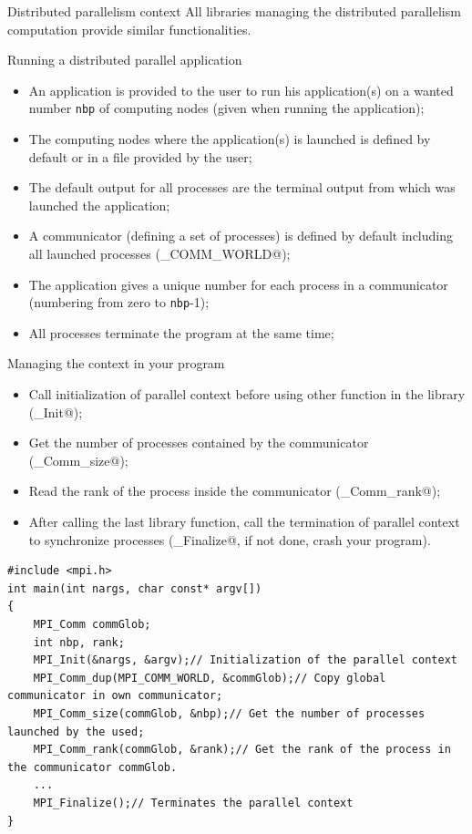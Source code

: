 \documentclass[compress,10pt,aspectratio=169]{beamer}
\begin{document}
\begin{frame}[fragile]{Distributed parallelism context}
    \small
    All libraries managing the distributed parallelism computation provide similar functionalities.

    \begin{block}{\small Running a distributed parallel application}
        \begin{itemize}
            \item An application is provided to the user to run his application(s) on a wanted number \texttt{nbp} of computing nodes (given when running the application);
            \item The computing nodes where the application(s) is launched is defined by default or in a file provided by the user;
            \item The default output for all processes are the terminal output from which was launched the application;
            \item A communicator (defining a set of processes) is defined by default including all launched processes (\verb@MPI_COMM_WORLD@);
            \item The application gives a unique number for each process in a communicator (numbering from zero to \texttt{nbp}-1);
            \item All processes terminate the program at the same time;
        \end{itemize}
    \end{block}
\end{frame}

\begin{frame}[fragile]{Managing the context in your program}
    \small
    \begin{itemize}
        \item Call initialization of parallel context before using other function in the library (\verb@MPI_Init@);
        \item Get the number of processes contained by the communicator (\verb@MPI_Comm_size@);
        \item Read the rank of the process inside the communicator (\verb@MPI_Comm_rank@);
        \item After calling the last library function, call the termination of parallel context to synchronize processes (\verb@MPI_Finalize@, if not done, crash your program).
    \end{itemize}

\begin{verbatim}
#include <mpi.h>
int main(int nargs, char const* argv[])
{
    MPI_Comm commGlob;
    int nbp, rank;
    MPI_Init(&nargs, &argv);// Initialization of the parallel context
    MPI_Comm_dup(MPI_COMM_WORLD, &commGlob);// Copy global communicator in own communicator;
    MPI_Comm_size(commGlob, &nbp);// Get the number of processes launched by the used;
    MPI_Comm_rank(commGlob, &rank);// Get the rank of the process in the communicator commGlob.
    ...
    MPI_Finalize();// Terminates the parallel context
}
\end{verbatim}

\end{frame}
\end{document}
